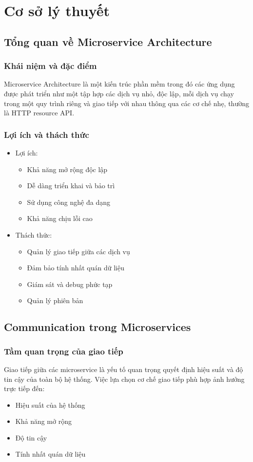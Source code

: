 \chapter{Cơ sở lý thuyết}

\section{Tổng quan về Microservice Architecture}
\subsection{Khái niệm và đặc điểm}
Microservice Architecture là một kiến trúc phần mềm trong đó các ứng dụng được phát triển như một tập hợp các dịch vụ nhỏ, độc lập, mỗi dịch vụ chạy trong một quy trình riêng và giao tiếp với nhau thông qua các cơ chế nhẹ, thường là HTTP resource API.

\subsection{Lợi ích và thách thức}
\begin{itemize}
    \item Lợi ích:
    \begin{itemize}
        \item Khả năng mở rộng độc lập
        \item Dễ dàng triển khai và bảo trì
        \item Sử dụng công nghệ đa dạng
        \item Khả năng chịu lỗi cao
    \end{itemize}
    \item Thách thức:
    \begin{itemize}
        \item Quản lý giao tiếp giữa các dịch vụ
        \item Đảm bảo tính nhất quán dữ liệu
        \item Giám sát và debug phức tạp
        \item Quản lý phiên bản
    \end{itemize}
\end{itemize}

\section{Communication trong Microservices}
\subsection{Tầm quan trọng của giao tiếp}
Giao tiếp giữa các microservice là yếu tố quan trọng quyết định hiệu suất và độ tin cậy của toàn bộ hệ thống. Việc lựa chọn cơ chế giao tiếp phù hợp ảnh hưởng trực tiếp đến:
\begin{itemize}
    \item Hiệu suất của hệ thống
    \item Khả năng mở rộng
    \item Độ tin cậy
    \item Tính nhất quán dữ liệu
\end{itemize}

